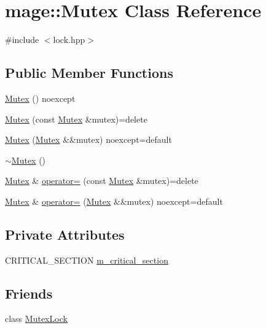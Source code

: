 \hypertarget{classmage_1_1_mutex}{}\section{mage\+:\+:Mutex Class Reference}
\label{classmage_1_1_mutex}


{\ttfamily \#include $<$lock.\+hpp$>$}

\subsection*{Public Member Functions}
\begin{DoxyCompactItemize}
\item 
\hyperlink{classmage_1_1_mutex_a7d91a1e59c8d99dfbe2087d3a4a4bf6a}{Mutex} () noexcept
\item 
\hyperlink{classmage_1_1_mutex_af1c2c7d0134ba853903522d2f3684f22}{Mutex} (const \hyperlink{classmage_1_1_mutex}{Mutex} \&mutex)=delete
\item 
\hyperlink{classmage_1_1_mutex_a0892548844c742d75942b3a4ee85a90d}{Mutex} (\hyperlink{classmage_1_1_mutex}{Mutex} \&\&mutex) noexcept=default
\item 
\hyperlink{classmage_1_1_mutex_a143d82ec7bb43f953a1703caa7972e9d}{$\sim$\+Mutex} ()
\item 
\hyperlink{classmage_1_1_mutex}{Mutex} \& \hyperlink{classmage_1_1_mutex_a56072bdabdeadd5d897de232dbd298a0}{operator=} (const \hyperlink{classmage_1_1_mutex}{Mutex} \&mutex)=delete
\item 
\hyperlink{classmage_1_1_mutex}{Mutex} \& \hyperlink{classmage_1_1_mutex_a35e4c26ec9fd69bad0ce2465ee5132fd}{operator=} (\hyperlink{classmage_1_1_mutex}{Mutex} \&\&mutex) noexcept=default
\end{DoxyCompactItemize}
\subsection*{Private Attributes}
\begin{DoxyCompactItemize}
\item 
C\+R\+I\+T\+I\+C\+A\+L\+\_\+\+S\+E\+C\+T\+I\+ON \hyperlink{classmage_1_1_mutex_a18414337aef28b7ed261e7a805d2c103}{m\+\_\+critical\+\_\+section}
\end{DoxyCompactItemize}
\subsection*{Friends}
\begin{DoxyCompactItemize}
\item 
class \hyperlink{classmage_1_1_mutex_a7177018259362468923e579d8525b5d5}{Mutex\+Lock}
\end{DoxyCompactItemize}


